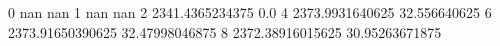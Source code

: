 0 nan nan
1 nan nan
2 2341.4365234375 0.0
4 2373.9931640625 32.556640625
6 2373.91650390625 32.47998046875
8 2372.38916015625 30.95263671875
